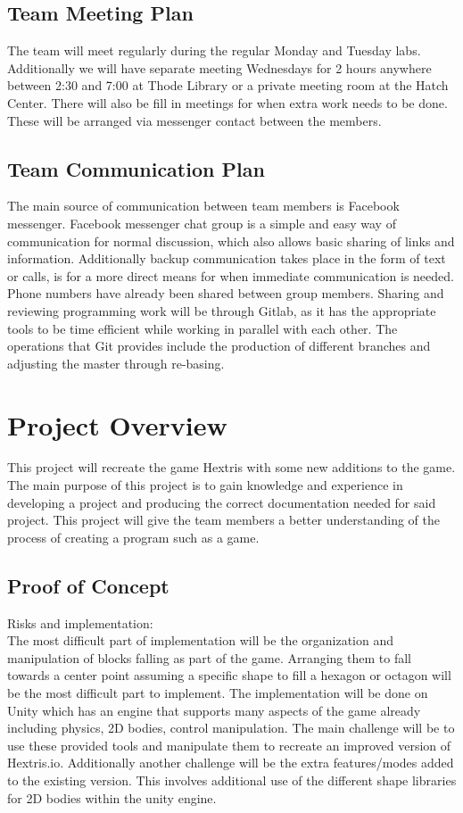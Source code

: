 \documentclass[12pt]{article}
\begin{document}
\subsection{Team Meeting Plan}
The team will meet regularly during the regular Monday and Tuesday labs. Additionally we will have separate meeting Wednesdays for 2 hours anywhere between 2:30 and 7:00 at Thode Library or a private meeting room at the Hatch Center. There will also be fill in meetings for when extra work needs to be done. These will be arranged via messenger contact between the members.

\newpage

\subsection{Team Communication Plan}
The main source of communication between team members is Facebook messenger. Facebook messenger chat group is a simple and easy way of communication for normal discussion, which also allows basic sharing of links and information. Additionally backup communication takes place in the form of text or calls, is for a more direct means for when immediate communication is needed. Phone numbers have already been shared between group members. Sharing and reviewing programming work will be through Gitlab, as it has the appropriate tools to be time efficient while working in parallel with each other. The operations that Git provides include the production of different branches and adjusting the master through re-basing. 


\section{Project Overview}
This project will recreate the game Hextris with some new additions to the game. The main purpose of this project is to gain knowledge and experience in developing a project and producing the correct documentation needed for said project. This project will give the team members a better understanding of the process of creating a program such as a game.

\subsection{Proof of Concept}
Risks and implementation:\\

The most difficult part of implementation will be the organization and manipulation of blocks falling as part of the game. Arranging them to fall towards a center point assuming a specific shape to fill a hexagon or octagon will be the most difficult part to implement. The implementation will be done on Unity which has an engine that supports many aspects of the game already including physics, 2D bodies, control manipulation. The main challenge will be to use these provided tools and manipulate them to recreate an improved version of Hextris.io. Additionally another challenge will be the extra features/modes added to the existing version. This involves additional use of the different shape libraries for 2D bodies within the unity engine.
\end{document}
